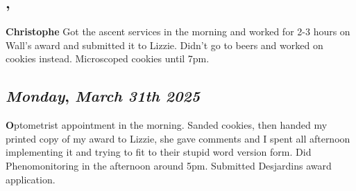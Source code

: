 \subsection*{\weekday, \day}
\textbf {Christophe}
Got the ascent services in the morning and worked for 2-3 hours on Wall's award and submitted it to Lizzie. Didn't go to beers and worked on cookies instead. Microscoped cookies until  7pm.

\def\day{\textit{March 31th 2025}}
\def\weekday{\textit{Monday}}
\subsection*{\weekday, \day}
\textbf
Optometrist appointment in the morning. Sanded cookies, then handed my printed copy of my award to Lizzie, she gave comments and I spent all afternoon implementing it and trying to fit to their stupid word version form. Did Phenomonitoring in the afternoon around 5pm. Submitted Desjardins award application.